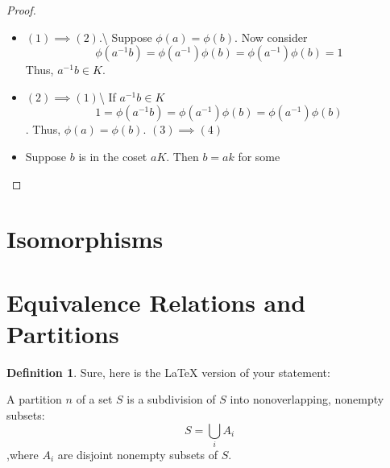 \documentclass[
]{book}
\providecommand{\tightlist}{%
  \setlength{\itemsep}{0pt}\setlength{\parskip}{0pt}}
\theoremstyle{definition}
\newtheorem{definition}{Definition}[chapter]
\theoremstyle{definition}
\theoremstyle{definition}
\theoremstyle{definition}
\theoremstyle{remark}
\begin{document}
\begin{proof}
\leavevmode

\begin{itemize}
\tightlist
\item
  \((1)\implies (2)\).\textbackslash{}
  Suppose \(\phi(a) = \phi(b)\). Now consider
  \[\phi(a^{-1}b)=\phi(a^{-1})\phi(b)=\phi(a^{-1} )\phi(b)=1\]
  Thus, \(a^{-1}b\in K\).
\item
  \((2)\implies (1)\)\textbackslash{} If \(a^{-1}b \in K\)
  \[1=\phi(a^{-1}b)=\phi(a^{-1})\phi(b)=\phi(a^{-1} )\phi(b)\].
  Thus, \(\phi(a)=\phi(b)\).
  \((3) \implies (4)\)
\item
  Suppose \(b\) is in the coset \(aK\). Then \(b=ak\) for some
\end{itemize}

\end{proof}

\hypertarget{isomorphisms}{%
\section{Isomorphisms}\label{isomorphisms}}

\hypertarget{equivalence-relations-and-partitions}{%
\section{Equivalence Relations and Partitions}\label{equivalence-relations-and-partitions}}

\begin{definition}
\protect\hypertarget{def:unnamed-chunk-26}{}\label{def:unnamed-chunk-26}Sure, here is the LaTeX version of your statement:

A partition \(n\) of a set \(S\) is a subdivision of \(S\) into nonoverlapping, nonempty subsets:
\[S = \bigcup_{i} A_i\]
,where \(A_i\) are disjoint nonempty subsets of \(S\).
\end{definition}
\end{document}
